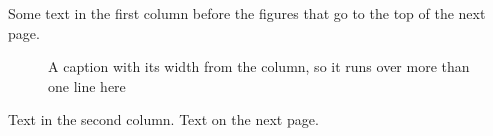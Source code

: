 \documentclass[twocolumn]{article}
\begin{document}
Some text in the first column before the figures that go to the top of the next page.
\begin{figure}
\vspace{40pt}
\caption{A caption with its width from the column, so it runs over more than one line here}
\end{figure}
\begin{table}
\captionsetup{width=0.5\linewidth}
\caption{A caption half as wide as the text, long enough to be set as a paragraph of two lines}
\vspace{30pt}
\end{table}
\newpage
Text in the second column.
\newpage
Text on the next page.
\end{document}

